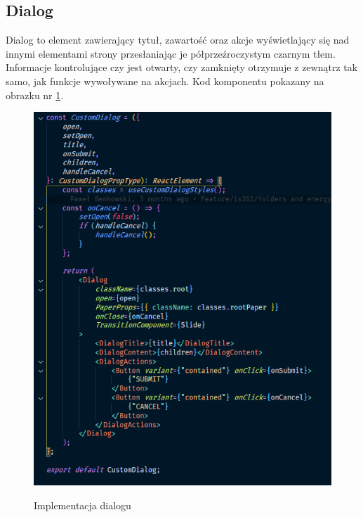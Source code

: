 \documentclass[a4paper,11pt]{report}
\begin{document}
\subsection{Dialog}
\label{subsec:dialog}
Dialog to element zawierający tytuł, zawartość oraz akcje wyświetlający się nad innymi
 elementami strony przesłaniając je półprzeźroczystym czarnym tłem.
Informacje kontrolujące czy jest otwarty, czy zamknięty otrzymuje z zewnątrz tak samo, jak funkcje wywoływane na akcjach.
Kod komponentu pokazany na obrazku nr \ref{fig:dialog}.
\begin{figure}[H]
	\centering
	\includegraphics[scale=0.5]{implementacja/frontend/dialog}\\
	\caption{Implementacja dialogu}
	\label{fig:dialog}
\end{figure}
\end{document}
